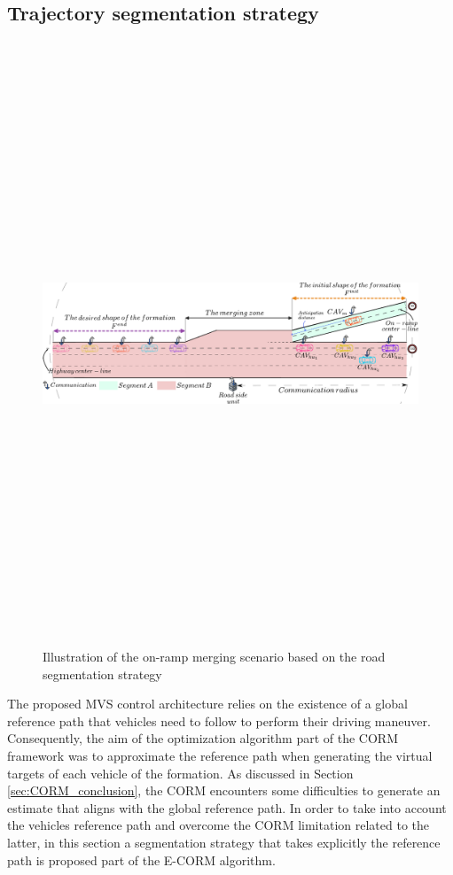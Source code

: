 \subsection{Trajectory segmentation strategy} \label{sec:RoadSegmentationStrategie}


       \begin{figure}[!h]
        \centering 
        \includegraphics[width=12.5cm,height=18cm,keepaspectratio]{chapters/Chapitre_5/Figures/ScenarioScene.pdf}
        \caption{Illustration of the on-ramp merging scenario based on the road segmentation strategy}
        \label{fig:Road_Segmentation}
        \end{figure}

The proposed MVS control architecture relies on the existence of a global reference path that vehicles need to follow to perform their driving maneuver. Consequently, the aim of the optimization algorithm part of the CORM framework was to approximate the reference path when generating the virtual targets of each vehicle of the formation. As discussed in Section \ref{sec:CORM_conclusion}, the CORM encounters some difficulties to generate an estimate that aligns with the global reference path. In order to take into account the vehicles reference path and overcome the CORM limitation related to the latter, in this section a segmentation strategy that takes explicitly the reference path is proposed part of the E-CORM algorithm. 

